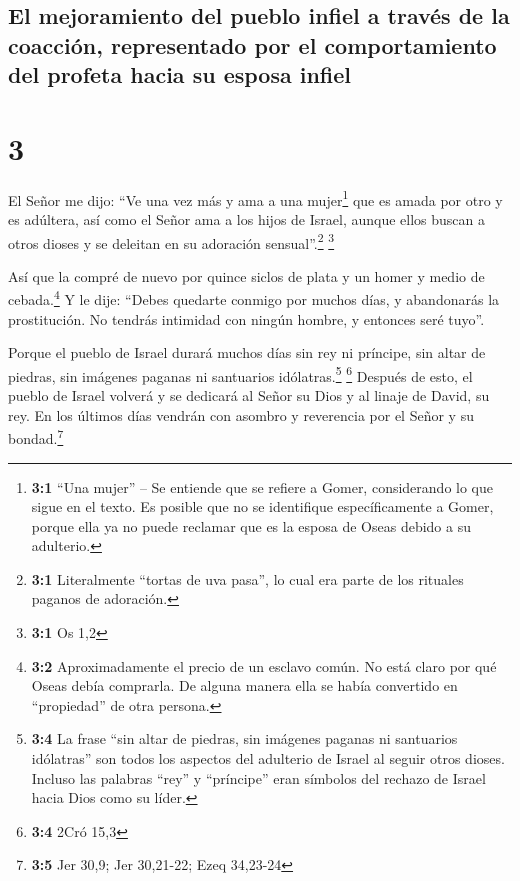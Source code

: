 \hypertarget{el-mejoramiento-del-pueblo-infiel-a-travuxe9s-de-la-coacciuxf3n-representado-por-el-comportamiento-del-profeta-hacia-su-esposa-infiel}{%
\subsection{El mejoramiento del pueblo infiel a través de la coacción,
representado por el comportamiento del profeta hacia su esposa
infiel}\label{el-mejoramiento-del-pueblo-infiel-a-travuxe9s-de-la-coacciuxf3n-representado-por-el-comportamiento-del-profeta-hacia-su-esposa-infiel}}

\hypertarget{section-2}{%
\section{3}\label{section-2}}

 El Señor me dijo: ``Ve una vez más y ama a una
mujer\footnote{\textbf{3:1} ``Una mujer'' -- Se entiende que se refiere
  a Gomer, considerando lo que sigue en el texto. Es posible que no se
  identifique específicamente a Gomer, porque ella ya no puede reclamar
  que es la esposa de Oseas debido a su adulterio.} que es amada por
otro y es adúltera, así como el Señor ama a los hijos de Israel, aunque
ellos buscan a otros dioses y se deleitan en su adoración
sensual''.\footnote{\textbf{3:1} Literalmente ``tortas de uva pasa'', lo
  cual era parte de los rituales paganos de adoración.} \footnote{\textbf{3:1}
  Os 1,2}

 Así que la compré de nuevo por quince siclos de plata y
un homer y medio de cebada.\footnote{\textbf{3:2} Aproximadamente el
  precio de un esclavo común. No está claro por qué Oseas debía
  comprarla. De alguna manera ella se había convertido en ``propiedad''
  de otra persona.}  Y le dije: ``Debes quedarte conmigo
por muchos días, y abandonarás la prostitución. No tendrás intimidad con
ningún hombre, y entonces seré tuyo''.

 Porque el pueblo de Israel durará muchos días sin rey ni
príncipe, sin altar de piedras, sin imágenes paganas ni santuarios
idólatras.\footnote{\textbf{3:4} La frase ``sin altar de piedras, sin
  imágenes paganas ni santuarios idólatras'' son todos los aspectos del
  adulterio de Israel al seguir otros dioses. Incluso las palabras
  ``rey'' y ``príncipe'' eran símbolos del rechazo de Israel hacia Dios
  como su líder.} \footnote{\textbf{3:4} 2Cró 15,3} 
Después de esto, el pueblo de Israel volverá y se dedicará al Señor su
Dios y al linaje de David, su rey. En los últimos días vendrán con
asombro y reverencia por el Señor y su bondad.\footnote{\textbf{3:5} Jer
  30,9; Jer 30,21-22; Ezeq 34,23-24}

